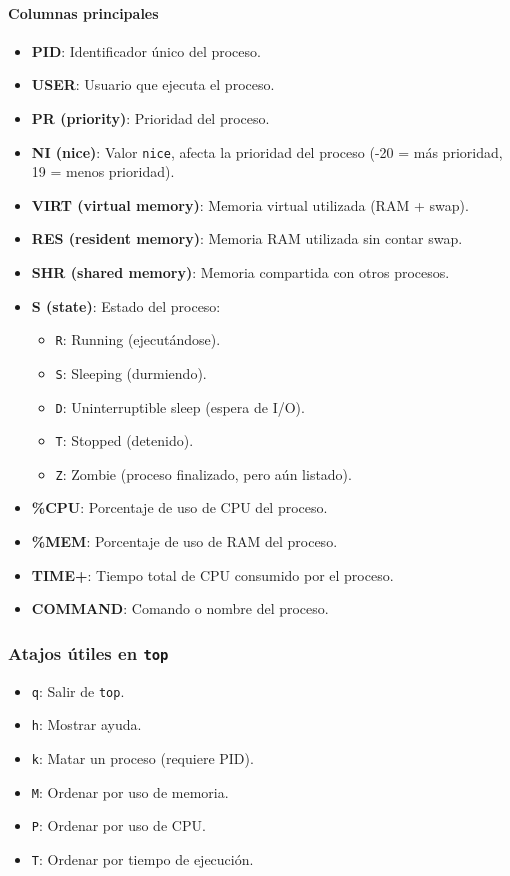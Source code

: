 \paragraph{Columnas principales}
\begin{itemize}
  \item \textbf{PID}: Identificador único del proceso.
  \item \textbf{USER}: Usuario que ejecuta el proceso.
  \item \textbf{PR (priority)}: Prioridad del proceso.
  \item \textbf{NI (nice)}: Valor \texttt{nice}, afecta la prioridad del proceso (-20 = más prioridad, 19 = menos prioridad).
  \item \textbf{VIRT (virtual memory)}: Memoria virtual utilizada (RAM + swap).
  \item \textbf{RES (resident memory)}: Memoria RAM utilizada sin contar swap.
  \item \textbf{SHR (shared memory)}: Memoria compartida con otros procesos.
  \item \textbf{S (state)}: Estado del proceso:
  \begin{itemize}
    \item \texttt{R}: Running (ejecutándose).
    \item \texttt{S}: Sleeping (durmiendo).
    \item \texttt{D}: Uninterruptible sleep (espera de I/O).
    \item \texttt{T}: Stopped (detenido).
    \item \texttt{Z}: Zombie (proceso finalizado, pero aún listado).
  \end{itemize}
  \item \textbf{\%CPU}: Porcentaje de uso de CPU del proceso.
  \item \textbf{\%MEM}: Porcentaje de uso de RAM del proceso.
  \item \textbf{TIME+}: Tiempo total de CPU consumido por el proceso.
  \item \textbf{COMMAND}: Comando o nombre del proceso.
\end{itemize}

\subsubsection*{Atajos útiles en \texttt{top}}

\begin{itemize}
  \item \texttt{q}: Salir de \texttt{top}.
  \item \texttt{h}: Mostrar ayuda.
  \item \texttt{k}: Matar un proceso (requiere PID).
  \item \texttt{M}: Ordenar por uso de memoria.
  \item \texttt{P}: Ordenar por uso de CPU.
  \item \texttt{T}: Ordenar por tiempo de ejecución.
\end{itemize}


